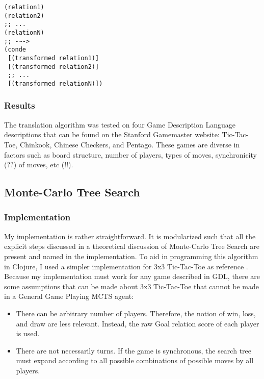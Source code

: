 \documentclass[letterpaper]{article}
\begin{document}
\begin{lstlisting}[frame=single,caption=Multiple related relations are joined by disjunction]
(relation1)
(relation2)
;; ...
(relationN)
;; -~->
(conde
 [(transformed relation1)]
 [(transformed relation2)]
 ;; ...
 [(transformed relationN)])
\end{lstlisting} 


\subsubsection{Results}
The translation algorithm was tested on four Game Description Language descriptions that can be found on the Stanford Gamemaster website: Tic-Tac-Toe, Chinkook, Chinese Checkers, and Pentago. These games are diverse in factors such as board structure, number of players, types of moves, synchronicity (??) of moves, etc (!!).

\subsection{Monte-Carlo Tree Search}

\subsubsection{Implementation}
My implementation is rather straightforward. It is modularized such that all the explicit steps discussed in a theoretical discussion of Monte-Carlo Tree Search are present and named in the implementation. To aid in programming this algorithm in Clojure, I used a simpler implementation for 3x3 Tic-Tac-Toe as reference \cite{randomcomp}. Because my implementation must work for any game described in GDL, there are some assumptions that can be made about 3x3 Tic-Tac-Toe that cannot be made in a General Game Playing MCTS agent:
\begin{itemize}
\item There can be arbitrary number of players. Therefore, the notion of win, loss, and draw are less relevant. Instead, the raw Goal relation score of each player is used.
\item There are not necessarily turns. If the game is synchronous, the search tree must expand according to all possible combinations of possible moves by all players.

\end{itemize}
\end{document}
